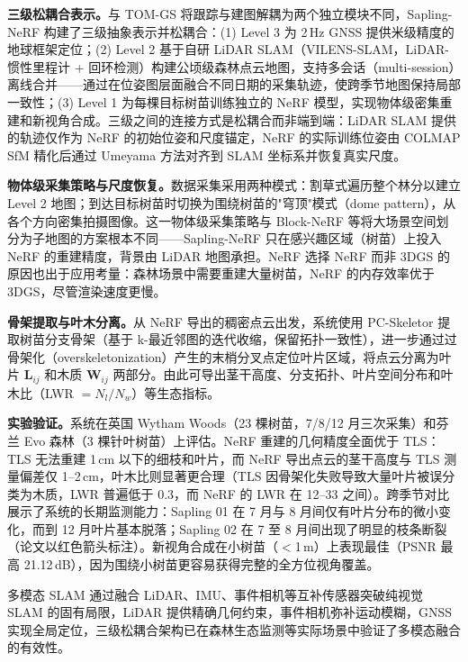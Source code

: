 \textbf{三级松耦合表示。}与 TOM-GS 将跟踪与建图解耦为两个独立模块不同，Sapling-NeRF 构建了三级抽象表示并松耦合：(1) Level 3 为 2\,Hz GNSS 提供米级精度的地球框架定位；(2) Level 2 基于自研 LiDAR SLAM（VILENS-SLAM，LiDAR-惯性里程计 + 回环检测）构建公顷级森林点云地图，支持多会话（multi-session）离线合并——通过在位姿图层面融合不同日期的采集轨迹，使跨季节地图保持局部一致性；(3) Level 1 为每棵目标树苗训练独立的 NeRF 模型，实现物体级密集重建和新视角合成。三级之间的连接方式是松耦合而非端到端：LiDAR SLAM 提供的轨迹仅作为 NeRF 的初始位姿和尺度锚定，NeRF 的实际训练位姿由 COLMAP SfM 精化后通过 Umeyama 方法对齐到 SLAM 坐标系并恢复真实尺度。

\textbf{物体级采集策略与尺度恢复。}数据采集采用两种模式：割草式遍历整个林分以建立 Level 2 地图；到达目标树苗时切换为围绕树苗的"穹顶"模式（dome pattern），从各个方向密集拍摄图像。这一物体级采集策略与 Block-NeRF 等将大场景空间划分为子地图的方案根本不同——Sapling-NeRF 只在感兴趣区域（树苗）上投入 NeRF 的重建精度，背景由 LiDAR 地图承担。NeRF 选择 NeRF 而非 3DGS 的原因也出于应用考量：森林场景中需要重建大量树苗，NeRF 的内存效率优于 3DGS，尽管渲染速度更慢。

\textbf{骨架提取与叶木分离。}从 NeRF 导出的稠密点云出发，系统使用 PC-Skeletor 提取树苗分支骨架（基于 k-最近邻图的迭代收缩，保留拓扑一致性），进一步通过过骨架化（overskeletonization）产生的末梢分叉点定位叶片区域，将点云分离为叶片 $\mathbf{L}_{ij}$ 和木质 $\mathbf{W}_{ij}$ 两部分。由此可导出茎干高度、分支拓扑、叶片空间分布和叶木比（LWR $= N_l / N_w$）等生态指标。

\textbf{实验验证。}系统在英国 Wytham Woods（23 棵树苗，7/8/12 月三次采集）和芬兰 Evo 森林（3 棵针叶树苗）上评估。NeRF 重建的几何精度全面优于 TLS：TLS 无法重建 1\,cm 以下的细枝和叶片，而 NeRF 导出点云的茎干高度与 TLS 测量偏差仅 1--2\,cm，叶木比则显著更合理（TLS 因骨架化失败导致大量叶片被误分类为木质，LWR 普遍低于 0.3，而 NeRF 的 LWR 在 12--33 之间）。跨季节对比展示了系统的长期监测能力：Sapling 01 在 7 月与 8 月间仅有叶片分布的微小变化，而到 12 月叶片基本脱落；Sapling 02 在 7 至 8 月间出现了明显的枝条断裂（论文以红色箭头标注）。新视角合成在小树苗（$<$1\,m）上表现最佳（PSNR 最高 21.12\,dB），因为围绕小树苗更容易获得完整的全方位视角覆盖。

\begin{takeaway}
多模态 SLAM 通过融合 LiDAR、IMU、事件相机等互补传感器突破纯视觉 SLAM 的固有局限，LiDAR 提供精确几何约束，事件相机弥补运动模糊，GNSS 实现全局定位，三级松耦合架构已在森林生态监测等实际场景中验证了多模态融合的有效性。
\end{takeaway}

